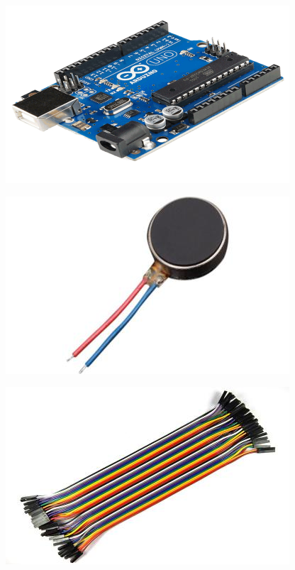 \documentclass[
	11pt, %
	t, %
	aspectratio=169, %
]{beamer}
\begin{document}
\begin{frame}
\begin{center}
			\begin{minipage}{0.30\textwidth}
		\includegraphics[width=\textwidth]{./resized_400x250/arduino.png}
	\end{minipage}\hfill
	\begin{minipage}{0.30\textwidth}
		\includegraphics[width=\textwidth]{./resized_400x250/vibrating motor.jpg}
	\end{minipage}\hfill
	\begin{minipage}{0.30\textwidth}
		\includegraphics[width=\textwidth]{./resized_400x250/wire.jpg}
	\end{minipage}
	\end{center}
	
\end{frame}
\end{document}
